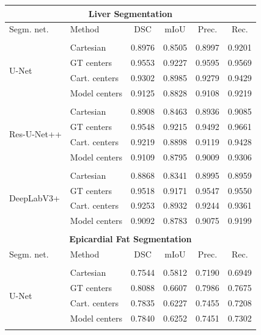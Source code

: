 \begin{table}
\ContinuedFloat
\centering
\def\arraystretch{1.2}
\begin{tabularx}{\textwidth}{X X c c c c} 
\\ [-2ex]
\multicolumn{6}{c}{\textbf{Liver Segmentation}}\\[1ex]
 \hline
 Segm. net. & Method & DSC & mIoU & Prec. & Rec. \\ 
 \hline \\ [-1.5ex]
 \multirow{4}{7em}{{U-Net}}
& Cartesian & 0.8976 & 0.8505 & 0.8997 & 0.9201 \\
& GT centers & 0.9553 & 0.9227 & 0.9595 & 0.9569 \\
& Cart. centers & 0.9302 & 0.8985 & 0.9279 & 0.9429 \\
& Model centers & 0.9125 & 0.8828 & 0.9108 & 0.9219 \\ [1ex]
\hline \\ [-1.5ex]

 \multirow{4}{7em}{{Res-U-Net++}}
& Cartesian & 0.8908 & 0.8463 & 0.8936 & 0.9085 \\
& GT centers & 0.9548 & 0.9215 & 0.9492 & 0.9661 \\
& Cart. centers & 0.9219 & 0.8898 & 0.9119 & 0.9428 \\
& Model centers & 0.9109 & 0.8795 & 0.9009 & 0.9306 \\ [1ex]
\hline \\ [-1.5ex]

 \multirow{4}{7em}{{DeepLabV3+}}
& Cartesian & 0.8868 & 0.8341 & 0.8995 & 0.8959 \\
& GT centers & 0.9518 & 0.9171 & 0.9547 & 0.9550 \\
& Cart. centers & 0.9253 & 0.8932 & 0.9244 & 0.9361 \\
& Model centers & 0.9092 & 0.8783 & 0.9075 & 0.9199 \\ [1ex]
\hline \\ [-1.5ex]

\multicolumn{6}{c}{\textbf{Epicardial Fat Segmentation}}\\[1ex]
 \hline
 Segm. net. & Method & DSC & mIoU & Prec. & Rec. \\ 
 \hline \\ [-1.5ex]
 \multirow{4}{7em}{{U-Net}}
& Cartesian & 0.7544 & 0.5812 & 0.7190 & 0.6949 \\
& GT centers & 0.8088 & 0.6607 & 0.7986 & 0.7675 \\
& Cart. centers & 0.7835 & 0.6227 & 0.7455 & 0.7208 \\
& Model centers & 0.7840 & 0.6252 & 0.7451 & 0.7302 \\ [1ex]
\hline \\ [-1.5ex]


\end{tabularx}
\end{table}
